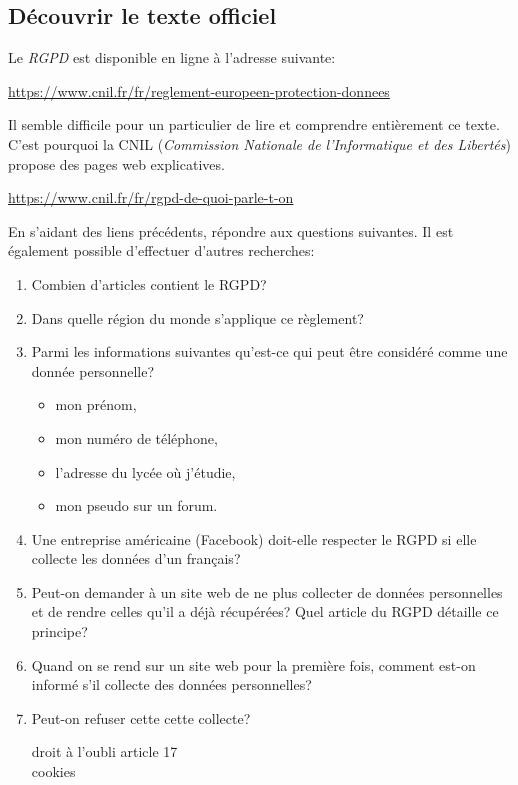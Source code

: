 \documentclass[a4paper,11pt]{article}
\begin{document}
\begin{Form}
\subsection{Découvrir le texte officiel}
Le \emph{RGPD} est disponible en ligne à l'adresse suivante:
\begin{center}
\url{https://www.cnil.fr/fr/reglement-europeen-protection-donnees}
\end{center}
Il semble difficile pour un particulier de lire et comprendre entièrement ce texte. C'est pourquoi la CNIL (\emph{Commission Nationale de l'Informatique et des Libertés}) propose des pages web explicatives.
\begin{center}
\url{https://www.cnil.fr/fr/rgpd-de-quoi-parle-t-on}
\end{center}
\begin{activite}
En s'aidant des liens précédents, répondre aux questions suivantes. Il est également possible d'effectuer d'autres recherches:
\begin{enumerate}
\item Combien d'articles contient le RGPD?
\item Dans quelle région du monde s'applique ce règlement?
\item Parmi les informations suivantes qu'est-ce qui peut être considéré comme une donnée personnelle?
\begin{itemize}
\item mon prénom,
\item mon numéro de téléphone,
\item l'adresse du lycée où j'étudie,
\item mon pseudo sur un forum.
\end{itemize}
\item Une entreprise américaine (Facebook) doit-elle respecter le RGPD si elle collecte les données d'un français?
\item Peut-on demander à un site web de ne plus collecter de données personnelles et de rendre celles qu'il a déjà récupérées? Quel article du RGPD détaille ce principe?
\item Quand on se rend sur un site web pour la première fois, comment est-on informé s'il collecte des données personnelles?
\item Peut-on refuser cette cette collecte?
\begin{commentprof}
droit à l'oubli article 17\\cookies
\end{commentprof}

\end{enumerate}
\end{activite}
\end{Form}
\end{document}
